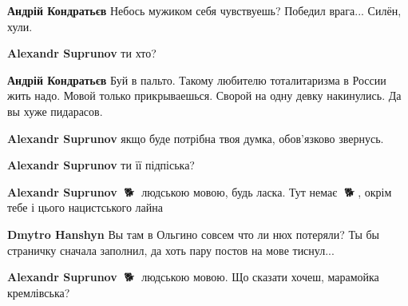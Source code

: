 \begin{itemize}
\begin{itemize}
\textbf{Андрій Кондратьєв} Небось мужиком себя чувствуешь? Победил врага... Силён, хули.

 
\textbf{Alexandr Suprunov} ти хто?

 
\textbf{Андрій Кондратьєв} Буй в пальто. Такому любителю тоталитаризма в России жить надо. Мовой только прикрываешься. Сворой на одну девку накинулись. Да вы хуже пидарасов.

 
\textbf{Alexandr Suprunov} якщо буде потрібна твоя думка, обов'язково звернусь.

 
\textbf{Alexandr Suprunov} ти її підпіська?

 
\textbf{Alexandr Suprunov} 🐷🐕🦺 людською мовою, будь ласка. Тут немає 🐷🐕🦺, окрім тебе і цього нацистського лайна

 
\textbf{Dmytro Hanshyn} Вы там в Ольгино совсем что ли нюх потеряли? Ты бы страничку сначала заполнил, да хоть пару постов на мове тиснул...

 
\textbf{Alexandr Suprunov} 🐷🐕🦺 людською мовою. Що сказати хочеш, марамойка кремлівська?

\end{itemize}


\end{itemize}
